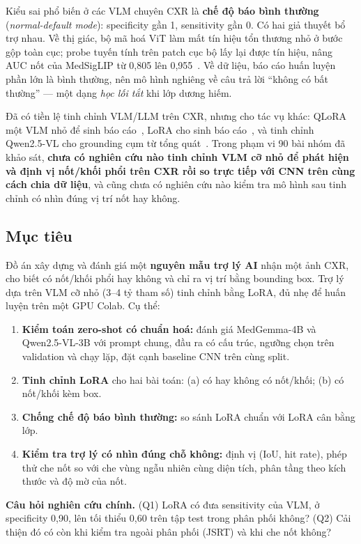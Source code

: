 Kiểu sai phổ biến ở các VLM chuyên CXR là \textbf{chế độ báo bình thường} (\emph{normal-default mode}):
specificity gần 1, sensitivity gần 0. Có hai giả thuyết bổ trợ nhau. Về thị giác, bộ mã hoá ViT làm mất tín
hiệu tổn thương nhỏ ở bước gộp toàn cục; probe tuyến tính trên patch cục bộ lấy lại được tín hiệu, nâng AUC
nốt của MedSigLIP từ 0,805 lên 0,955~\cite{muthyala2026frozen}. Về dữ liệu, báo cáo huấn luyện phần lớn là
bình thường, nên mô hình nghiêng về câu trả lời ``không có bất thường'' --- một dạng \emph{học lối tắt} khi
lớp dương hiếm.

Đã có tiền lệ tinh chỉnh VLM/LLM trên CXR, nhưng cho tác vụ khác: QLoRA một VLM nhỏ để sinh báo
cáo~\cite{volkov2025lora}, LoRA cho sinh báo cáo~\cite{gao2026s2d}, và tinh chỉnh Qwen2.5-VL cho grounding
cụm từ tổng quát~\cite{xu2025medground}. Trong phạm vi 90 bài nhóm đã khảo sát, \textbf{chưa có nghiên cứu
nào tinh chỉnh VLM cỡ nhỏ để phát hiện và định vị nốt/khối phổi trên CXR rồi so trực tiếp với CNN trên cùng
cách chia dữ liệu}, và cũng chưa có nghiên cứu nào kiểm tra mô hình sau tinh chỉnh có nhìn đúng vị trí nốt hay không.

\subsection{Mục tiêu}

Đồ án xây dựng và đánh giá một \textbf{nguyên mẫu trợ lý AI} nhận một ảnh CXR, cho biết có nốt/khối phổi hay
không và chỉ ra vị trí bằng bounding box. Trợ lý dựa trên VLM cỡ nhỏ (3--4 tỷ tham số) tinh chỉnh bằng LoRA,
đủ nhẹ để huấn luyện trên một GPU Colab. Cụ thể:
\begin{enumerate}
  \item \textbf{Kiểm toán zero-shot có chuẩn hoá:} đánh giá MedGemma-4B và Qwen2.5-VL-3B với prompt chung,
        đầu ra có cấu trúc, ngưỡng chọn trên validation và chạy lặp, đặt cạnh baseline CNN trên cùng split.
  \item \textbf{Tinh chỉnh LoRA} cho hai bài toán: (a) có hay không có nốt/khối; (b) có nốt/khối kèm box.
  \item \textbf{Chống chế độ báo bình thường:} so sánh LoRA chuẩn với LoRA cân bằng lớp.
  \item \textbf{Kiểm tra trợ lý có nhìn đúng chỗ không:} định vị (IoU, hit rate), phép thử che nốt so với che
        vùng ngẫu nhiên cùng diện tích, phân tầng theo kích thước và độ mờ của nốt.
\end{enumerate}

\begin{keybox}
\textbf{Câu hỏi nghiên cứu chính.} (Q1) LoRA có đưa sensitivity của VLM, ở specificity 0,90, lên tối thiểu
0,60 trên tập test trong phân phối không? (Q2) Cải thiện đó có còn khi kiểm tra ngoài phân phối (JSRT) và khi
che nốt không?
\end{keybox}


